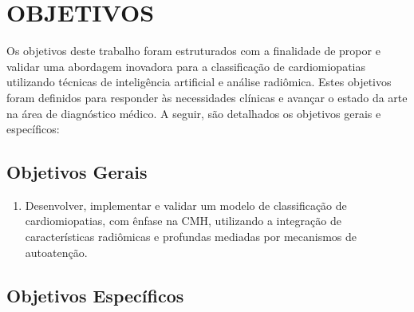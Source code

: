 \newpage

\section{OBJETIVOS}
\label{sec:cap1_objetivo}


Os objetivos deste trabalho foram estruturados com a finalidade de propor e validar uma abordagem inovadora para a classificação de cardiomiopatias utilizando técnicas de inteligência artificial e análise radiômica. Estes objetivos foram definidos para responder às necessidades clínicas e avançar o estado da arte na área de diagnóstico médico. A seguir, são detalhados os objetivos gerais e específicos:

\subsection{Objetivos Gerais}
\label{subsec:cap1_objetivo_geral}

\begin{enumerate}
\item Desenvolver, implementar e validar um modelo de classificação de cardiomiopatias, com ênfase na \gls{CMH}, utilizando a integração de características radiômicas e profundas mediadas por mecanismos de autoatenção.
\end{enumerate}

\subsection{Objetivos Específicos}
\label{subsec:cap1_objetivo_especific}

